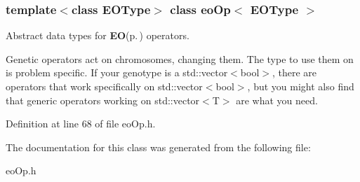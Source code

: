 \subsubsection*{template$<$class EOType$>$ class eo\-Op$<$ EOType $>$}

Abstract data types for {\bf EO}{\rm (p.\,\pageref{class_e_o})} operators. 

Genetic operators act on chromosomes, changing them. The type to use them on is problem specific. If your genotype is a std::vector$<$bool$>$, there are operators that work specifically on std::vector$<$bool$>$, but you might also find that generic operators working on std::vector$<$T$>$ are what you need. 



Definition at line 68 of file eo\-Op.h.

The documentation for this class was generated from the following file:\begin{CompactItemize}
\item 
eo\-Op.h\end{CompactItemize}
